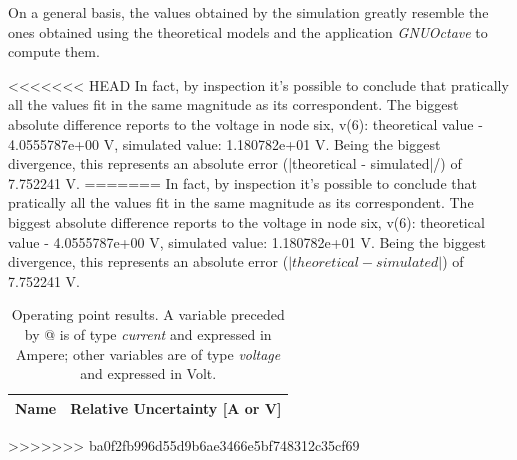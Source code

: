 On a general basis, the values obtained by the simulation greatly resemble the ones obtained using the theoretical models and the application \textit{GNUOctave} to compute them.

<<<<<<< HEAD
In fact, by inspection it's possible to conclude that pratically all the values fit in the same magnitude as its correspondent. The biggest absolute difference reports to the voltage in node six, v(6): theoretical value - 4.0555787e+00 V, simulated value: 1.180782e+01 V. Being the biggest divergence, this represents an absolute error (|theoretical - simulated|/) of 7.752241 V.
=======
In fact, by inspection it's possible to conclude that pratically all the values fit in the same magnitude as its correspondent. The biggest absolute difference reports to the voltage in node six, v(6): theoretical value - 4.0555787e+00 V, simulated value: 1.180782e+01 V. Being the biggest divergence, this represents an absolute error ($|theoretical - simulated|$) of 7.752241 V.

\begin{table}[htb!]
  \centering
  \begin{tabular}{|l|r|}
    \hline    
    {\bf Name} & {\bf Relative Uncertainty [A or V]} \\ \hline
    
  \end{tabular}
  \caption{Operating point results. A variable preceded by @ is of type {\em current}
    and expressed in Ampere; other variables are of type {\it voltage} and expressed in
    Volt.}
  \label{tab:errors}
\end{table}
>>>>>>> ba0f2fb996d55d9b6ae3466e5bf748312c35cf69

